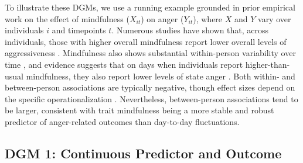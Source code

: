 To illustrate these DGMs, we use a running example grounded in prior empirical work on the effect of mindfulness (\(X_{it}\)) on anger (\(Y_{it}\)), where $X$ and $Y$ vary over individuals $i$ and timepoints $t$. Numerous studies have shown that, across individuals, those with higher overall mindfulness report lower overall levels of aggressiveness \parencite[]{brown_benefits_2003, borders_could_2010, kashdan_what_2016, baer_relationships_2011, eisenlohr-moul_both_2016}. Mindfulness also shows substantial within-person variability over time \parencite[]{brown_benefits_2003, kiken_state_2015}, and evidence suggests that on days when individuals report higher-than-usual mindfulness, they also report lower levels of state anger \parencite[]{eisenlohr-moul_both_2016}. Both within- and between-person associations are typically negative, though effect sizes depend on the specific operationalization \parencite{eisenlohr-moul_both_2016}. Nevertheless, between-person associations tend to be larger, consistent with trait mindfulness being a more stable and robust predictor of anger-related outcomes than day-to-day fluctuations.



\subsection{DGM 1: Continuous Predictor and Outcome}

